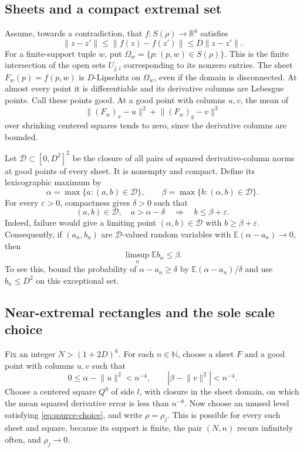 \documentclass[
  11pt,
]{article}
\theoremstyle{remark}\newtheorem{remark}[theorem]{Remark}
\newcommand{\R}{\mathbb R}\newcommand{\N}{\mathbb N}\newcommand{\Z}{\mathbb Z}
\newcommand{\norm}[1]{\lVert#1\rVert}\newcommand{\ip}[2]{\langle#1,#2\rangle}
\begin{document}
\subsection{Sheets and a compact extremal set}
Assume, towards a contradiction, that $f:S(\rho)\to\R^k$ satisfies
\begin{equation}\label{eq:bilip}
 \norm{z-z'}\le\norm{f(z)-f(z')}\le D\norm{z-z'}.
\end{equation}
For a finite-support tuple $w$, put $\Omega_w=\{p:(p,w)\in S(\rho)\}$. This is the finite intersection of the open sets $U_{j,i}$ corresponding to its nonzero entries. The sheet $F_w(p)=f(p,w)$ is $D$-Lipschitz on $\Omega_w$, even if the domain is disconnected. At almost every point it is differentiable and its derivative columns are Lebesgue points. Call these points good. At a good point with columns $u,v$, the mean of
\[
 \norm{(F_w)_x-u}^2+\norm{(F_w)_y-v}^2
\]
over shrinking centered squares tends to zero, since the derivative columns are bounded.

Let $\mathcal D\subset[0,D^2]^2$ be the closure of all pairs of squared derivative-column norms at good points of every sheet. It is nonempty and compact. Define its lexicographic maximum by
\[
 \alpha=\max\{a:(a,b)\in\mathcal D\},\qquad
 \beta=\max\{b:(\alpha,b)\in\mathcal D\}.
\]
For every $\varepsilon>0$, compactness gives $\delta>0$ such that
\[
 (a,b)\in\mathcal D,\quad a>\alpha-\delta
 \quad\Longrightarrow\quad b\le\beta+\varepsilon.
\]
Indeed, failure would give a limiting point $(\alpha,b)\in\mathcal D$ with $b\ge\beta+\varepsilon$. Consequently, if $(a_n,b_n)$ are $\mathcal D$-valued random variables with $\mathbb E(\alpha-a_n)\to0$, then
\begin{equation}\label{eq:lex}
 \limsup_n\mathbb E b_n\le\beta.
\end{equation}
To see this, bound the probability of $\alpha-a_n\ge\delta$ by $\mathbb E(\alpha-a_n)/\delta$ and use $b_n\le D^2$ on this exceptional set.

\subsection{Near-extremal rectangles and the sole scale choice}
Fix an integer $N>(1+2D)^k$. For each $n\in\N$, choose a sheet $F$ and a good point with columns $u,v$ such that
\[
 0\le\alpha-\norm u^2<n^{-4},\qquad
 |\beta-\norm v^2|<n^{-4}.
\]
Choose a centered square $Q^0$ of side $l$, with closure in the sheet domain, on which the mean squared derivative error is less than $n^{-8}$. Now choose an unused level satisfying \eqref{eq:source-choice}, and write $\rho=\rho_j$. This is possible for every such sheet and square, because its support is finite, the pair $(N,n)$ recurs infinitely often, and $\rho_j\to0$.
\end{document}
